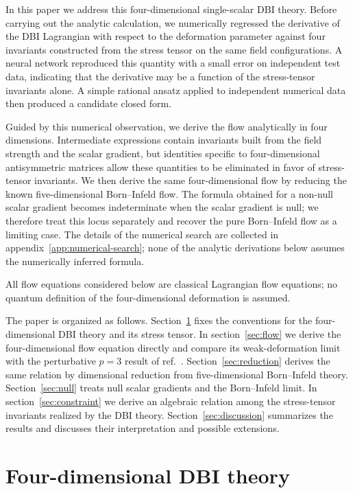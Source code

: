 \documentclass[a4paper,11pt]{article}
\numberwithin{equation}{section}
\begin{document}
In this paper we address this four-dimensional single-scalar DBI theory. Before carrying out the analytic calculation, we numerically regressed the derivative of the DBI Lagrangian with respect to the deformation parameter against four invariants constructed from the stress tensor on the same field configurations. A neural network reproduced this quantity with a small error on independent test data, indicating that the derivative may be a function of the stress-tensor invariants alone. A simple rational ansatz applied to independent numerical data then produced a candidate closed form.

Guided by this numerical observation, we derive the flow analytically in four dimensions. Intermediate expressions contain invariants built from the field strength and the scalar gradient, but identities specific to four-dimensional antisymmetric matrices allow these quantities to be eliminated in favor of stress-tensor invariants. We then derive the same four-dimensional flow by reducing the known five-dimensional Born--Infeld flow. The formula obtained for a non-null scalar gradient becomes indeterminate when the scalar gradient is null; we therefore treat this locus separately and recover the pure Born--Infeld flow as a limiting case. The details of the numerical search are collected in appendix~\ref{app:numerical-search}; none of the analytic derivations below assumes the numerically inferred formula.

All flow equations considered below are classical Lagrangian flow equations; no quantum definition of the four-dimensional deformation is assumed.

The paper is organized as follows. Section~\ref{sec:dbi} fixes the conventions for the four-dimensional DBI theory and its stress tensor. In section~\ref{sec:flow} we derive the four-dimensional flow equation directly and compare its weak-deformation limit with the perturbative $p=3$ result of ref.~\cite{Blair2025}. Section~\ref{sec:reduction} derives the same relation by dimensional reduction from five-dimensional Born--Infeld theory. Section~\ref{sec:null} treats null scalar gradients and the Born--Infeld limit. In section~\ref{sec:constraint} we derive an algebraic relation among the stress-tensor invariants realized by the DBI theory. Section~\ref{sec:discussion} summarizes the results and discusses their interpretation and possible extensions.

\section{Four-dimensional DBI theory}
\label{sec:dbi}
\end{document}
